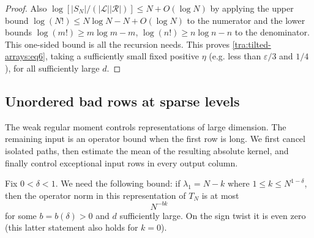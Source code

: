 \begin{proof}
Also
\(\log[ |S_N|/(|\mathcal L||\mathcal R|)]\le N+O(\log N)\)
by applying the upper bound $\log(N!)\le N\log N-N+O(\log N)$ to the numerator and the lower bounds $\log(m!)\ge m\log m-m$, $\log(n!)\ge n\log n-n$ to the denominator. This one-sided bound is all the recursion needs. This proves \eqref{tra:tilted-arrays:eq6}, taking a sufficiently small fixed positive \(\eta\) (e.g. less than \(\varepsilon/3\) and \(1/4\)), for all sufficiently large \(d\).
\end{proof}
\subsection{Unordered bad rows at sparse levels}
The weak regular moment controls representations of large dimension. The remaining input is an operator bound when the first row is long. We first cancel isolated paths, then estimate the mean of the resulting absolute kernel, and finally control exceptional input rows in every output column.
\begin{lemma}\label{tra:tilted-arrays:sparse}
\label{tra:tilted-arrays:sparse-statement}
Fix \(0<\delta<1\). We need the following bound: if \(\lambda_1=N-k\) where
\(1\le k\le N^{1-\delta}\), then the operator norm in this representation of \(T_N\) is at most
\begin{equation}
 N^{-b k} \label{tra:tilted-arrays:eq10}
\end{equation}
for some \(b=b(\delta)>0\) and \(d\) sufficiently large. On the sign twist it is even zero (this latter statement also holds for \(k=0\)).
\end{lemma}
